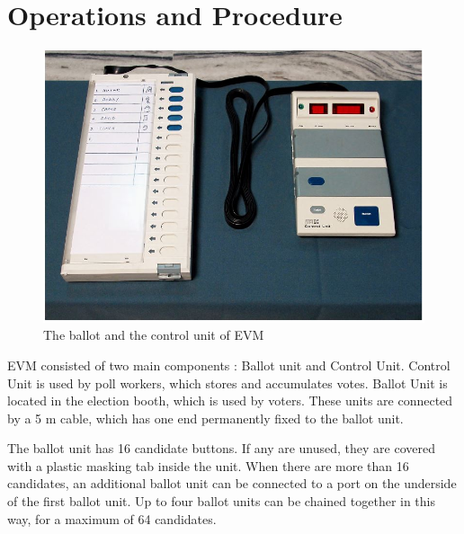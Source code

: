 \documentclass[a4paper,12pt,openany]{book}
\begin{document}
\section{Operations and Procedure}
\begin{figure}[!h]
\centering
\includegraphics[scale=0.5]{EVM_with_Control_Unit.JPG}
\caption{The ballot and the control unit of EVM}
\end{figure}
\newpage
EVM consisted of two main components : Ballot unit and Control Unit.
Control Unit is used by poll
workers, which stores and accumulates votes.
Ballot Unit
is located in the election booth, which is
used by voters. These units are connected by a 5 m cable, which has one end permanently fixed to the ballot
unit.


The ballot unit has 16 candidate buttons. If any are unused, they are covered with a plastic masking tab
inside the unit. When there are more than 16 candidates, an additional ballot unit can be connected to a port on
the underside of the first ballot unit. Up to four ballot units can be chained together in this way, for a maximum
of 64 candidates.\\
\end{document}
